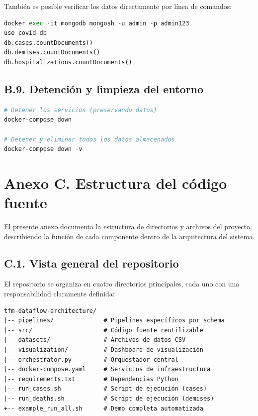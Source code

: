 \documentclass[12pt,a4paper]{article}
\begin{document}
También es posible verificar los datos directamente por línea de comandos:\\

\begin{lstlisting}[language=Python, caption=verificacion-mongo]
docker exec -it mongodb mongosh -u admin -p admin123
use covid-db
db.cases.countDocuments()
db.demises.countDocuments()
db.hospitalizations.countDocuments()
\end{lstlisting}

\subsection*{B.9. Detención y limpieza del entorno}

\begin{lstlisting}[language=Python, caption=docker-compose-up]
# Detener los servicios (preservando datos)
docker-compose down

# Detener y eliminar todos los datos almacenados
docker-compose down -v
\end{lstlisting}

\newpage
\section*{Anexo C. Estructura del código fuente}

El presente anexo documenta la estructura de directorios y archivos del proyecto, describiendo la función de cada componente dentro de la arquitectura del sistema.

\subsection*{C.1. Vista general del repositorio}

El repositorio se organiza en cuatro directorios principales, cada uno con una responsabilidad claramente definida:

\begin{verbatim}
tfm-dataflow-architecture/
|-- pipelines/              # Pipelines específicos por schema
|-- src/                    # Código fuente reutilizable
|-- datasets/               # Archivos de datos CSV
|-- visualization/          # Dashboard de visualización
|-- orchestrator.py         # Orquestador central
|-- docker-compose.yaml     # Servicios de infraestructura
|-- requirements.txt        # Dependencias Python
|-- run_cases.sh            # Script de ejecución (cases)
|-- run_deaths.sh           # Script de ejecución (demises)
+-- example_run_all.sh      # Demo completa automatizada
\end{verbatim}
\end{document}
